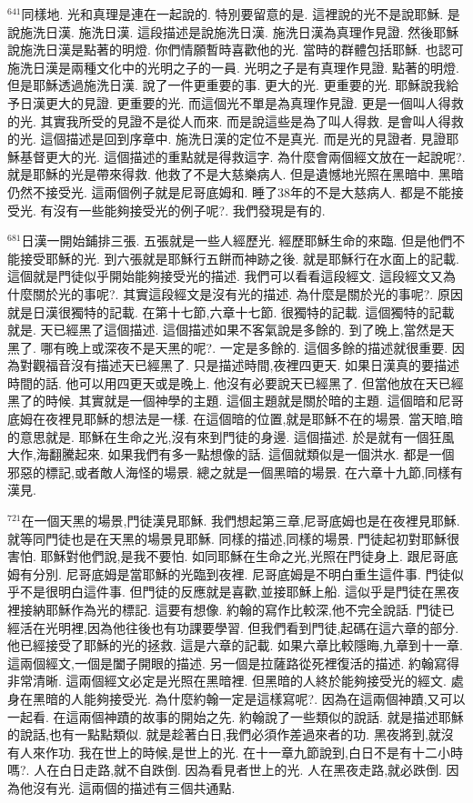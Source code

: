 \documentclass{book}
\begin{document}
$^{641}$同樣地.
光和真理是連在一起說的.
特別要留意的是.
這裡說的光不是說耶穌.
是說施洗日漢.
施洗日漢.
這段描述是說施洗日漢.
施洗日漢為真理作見證.
然後耶穌說施洗日漢是點著的明燈.
你們情願暫時喜歡他的光.
當時的群體包括耶穌.
也認可施洗日漢是兩種文化中的光明之子的一員.
光明之子是有真理作見證.
點著的明燈.
但是耶穌透過施洗日漢.
說了一件更重要的事.
更大的光.
更重要的光.
耶穌說我給予日漢更大的見證.
更重要的光.
而這個光不單是為真理作見證.
更是一個叫人得救的光.
其實我所受的見證不是從人而來.
而是說這些是為了叫人得救.
是會叫人得救的光.
這個描述是回到序章中.
施洗日漢的定位不是真光.
而是光的見證者.
見證耶穌基督更大的光.
這個描述的重點就是得救這字.
為什麼會兩個經文放在一起說呢?.
就是耶穌的光是帶來得救.
他救了不是大慈樂病人.
但是遺憾地光照在黑暗中.
黑暗仍然不接受光.
這兩個例子就是尼哥底姆和.
睡了38年的不是大慈病人.
都是不能接受光.
有沒有一些能夠接受光的例子呢?.
我們發現是有的.

$^{681}$日漢一開始鋪排三張.
五張就是一些人經歷光.
經歷耶穌生命的來臨.
但是他們不能接受耶穌的光.
到六張就是耶穌行五餅而神跡之後.
就是耶穌行在水面上的記載.
這個就是門徒似乎開始能夠接受光的描述.
我們可以看看這段經文.
這段經文又為什麼關於光的事呢?.
其實這段經文是沒有光的描述.
為什麼是關於光的事呢?.
原因就是日漢很獨特的記載.
在第十七節,六章十七節.
很獨特的記載.
這個獨特的記載就是.
天已經黑了這個描述.
這個描述如果不客氣說是多餘的.
到了晚上,當然是天黑了.
哪有晚上或深夜不是天黑的呢?.
一定是多餘的.
這個多餘的描述就很重要.
因為對觀福音沒有描述天已經黑了.
只是描述時間,夜裡四更天.
如果日漢真的要描述時間的話.
他可以用四更天或是晚上.
他沒有必要說天已經黑了.
但當他放在天已經黑了的時候.
其實就是一個神學的主題.
這個主題就是關於暗的主題.
這個暗和尼哥底姆在夜裡見耶穌的想法是一樣.
在這個暗的位置,就是耶穌不在的場景.
當天暗,暗的意思就是.
耶穌在生命之光,沒有來到門徒的身邊.
這個描述.
於是就有一個狂風大作,海翻騰起來.
如果我們有多一點想像的話.
這個就類似是一個洪水.
都是一個邪惡的標記,或者敵人海怪的場景.
總之就是一個黑暗的場景.
在六章十九節,同樣有漢見.

$^{721}$在一個天黑的場景,門徒漢見耶穌.
我們想起第三章,尼哥底姆也是在夜裡見耶穌.
就等同門徒也是在天黑的場景見耶穌.
同樣的描述,同樣的場景.
門徒起初對耶穌很害怕.
耶穌對他們說,是我不要怕.
如同耶穌在生命之光,光照在門徒身上.
跟尼哥底姆有分別.
尼哥底姆是當耶穌的光臨到夜裡.
尼哥底姆是不明白重生這件事.
門徒似乎不是很明白這件事.
但門徒的反應就是喜歡,並接耶穌上船.
這似乎是門徒在黑夜裡接納耶穌作為光的標記.
這要有想像.
約翰的寫作比較深,他不完全說話.
門徒已經活在光明裡,因為他往後也有功課要學習.
但我們看到門徒,起碼在這六章的部分.
他已經接受了耶穌的光的拯救.
這是六章的記載.
如果六章比較隱晦,九章到十一章.
這兩個經文,一個是闔子開眼的描述.
另一個是拉薩路從死裡復活的描述.
約翰寫得非常清晰.
這兩個經文必定是光照在黑暗裡.
但黑暗的人終於能夠接受光的經文.
處身在黑暗的人能夠接受光.
為什麼約翰一定是這樣寫呢?.
因為在這兩個神蹟,又可以一起看.
在這兩個神蹟的故事的開始之先.
約翰說了一些類似的說話.
就是描述耶穌的說話,也有一點點類似.
就是趁著白日,我們必須作差過來者的功.
黑夜將到,就沒有人來作功.
我在世上的時候,是世上的光.
在十一章九節說到,白日不是有十二小時嗎?.
人在白日走路,就不自跌倒.
因為看見者世上的光.
人在黑夜走路,就必跌倒.
因為他沒有光.
這兩個的描述有三個共通點.
\end{document}
